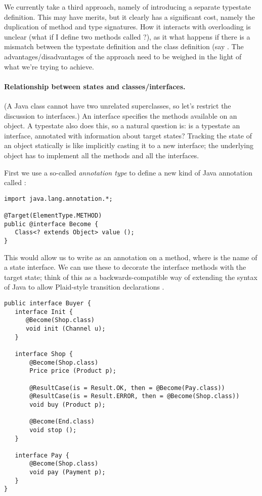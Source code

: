 We currently take a third approach, namely of introducing a separate
typestate definition. This may have merits, but it clearly has a
significant cost, namely the duplication of method and type
signatures. How it interacts with overloading is unclear (what if I
define two methods called ?), as it what happens if there is
a mismatch between the typestate definition and the class definition (say .
The advantages/disadvantages of the approach need to be weighed in the
light of what we're trying to achieve.

\paragraph{Relationship between states and classes/interfaces.}

(A Java class cannot have two unrelated superclasses, so let's
restrict the discussion to interfaces.) An interface specifies the
methods available on an object. A typestate also does this, so a
natural question is: is a typestate an interface, annotated with
information about target states? Tracking the state of an object
statically is like implicitly casting it to a new interface; the
underlying object has to implement all the methods and all the
interfaces.

First we use a so-called \emph{annotation type} to define a new kind
of Java annotation called :

\begin{lstlisting}
import java.lang.annotation.*;

@Target(ElementType.METHOD)
public @interface Become {
   Class<? extends Object> value ();
}
\end{lstlisting}

\noindent This would allow us to write  as
an annotation on a method, where  is the name of a state
interface. We can use these to decorate the interface methods with the
target state; think of this as a backwards-compatible way of extending
the syntax of Java to allow Plaid-style transition declarations
\cite{garcia14}.

\begin{lstlisting}
public interface Buyer {
   interface Init {
      @Become(Shop.class)
      void init (Channel u);
   }

   interface Shop {
       @Become(Shop.class)
       Price price (Product p);

       @ResultCase(is = Result.OK, then = @Become(Pay.class))
       @ResultCase(is = Result.ERROR, then = @Become(Shop.class))
       void buy (Product p);

       @Become(End.class)
       void stop ();
   }

   interface Pay {
       @Become(Shop.class)
       void pay (Payment p);
   }
}
\end{lstlisting}

